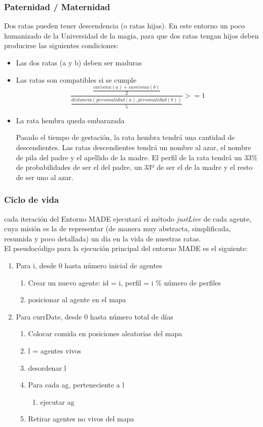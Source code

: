 \subsubsection{Paternidad / Maternidad}

Dos ratas pueden tener descendencia (o ratas hijas). En este entorno un poco
humanizado de la Universidad de la magia, para que dos ratas tengan hijos
deben producirse las siguientes condiciones:
\begin{itemize}
 \item Las dos ratas (a y b) deben ser maduras
 \item Las ratas son compatibles si se cumple
$$
\frac{\frac{carisma(a)+casrisma(b)}{2}}{\frac{distancia(personalidad(a),
personalidad(b))}{5} } >= 1
$$
 \item La rata hembra queda embarazada

Pasado el tiempo de gestación, la rata hembra tendrá una cantidad de
descendientes. Las ratas descendientes tendrá un nombre al azar, el nombre de
pila del padre y el apellido de la madre. El perfil de la rata tendrá un
33\% de probabilidades de ser el del padre, un 33º de ser el de la madre y el
resto de ser uno al azar. 
 
\end{itemize}

\subsubsection{Ciclo de vida}

cada iteración del Entorno MADE ejecutará el método \textit{justLive} de cada
agente, cuya misión es la de representar (de manera muy abstracta,
simplificada, resumida y poco detallada) un día en la vida de nuestras ratas.\\

El pseudocódigo para la ejecución principal del entorno MADE es el siguiente:

\begin{enumerate}
 \item Para i, desde 0 hasta número inicial de agentes
 \begin{enumerate}
  \item Crear un nuevo agente: id = i, perfil = i \% número de perfiles 
  \item posicionar al agente en el mapa
 \end{enumerate}
 \item Para currDate, desde 0 hasta número total de días
 \begin{enumerate}
  \item Colocar comida en posiciones aleatorias del mapa
  \item l = agentes vivos
  \item desordenar l
  \item Para cada ag, perteneciente a l
  \begin{enumerate}
   \item ejecutar ag
  \end{enumerate}
  \item Retirar agentes no vivos del mapa 
 \end{enumerate}
\end{enumerate}

